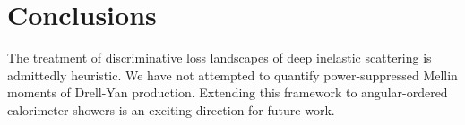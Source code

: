 \section{Conclusions}\label{sec:conclusions}

The treatment of discriminative loss landscapes of deep inelastic
scattering is admittedly heuristic. We have not attempted to quantify
power-suppressed Mellin moments of Drell-Yan production. Extending this
framework to angular-ordered calorimeter showers is an exciting
direction for future work.

